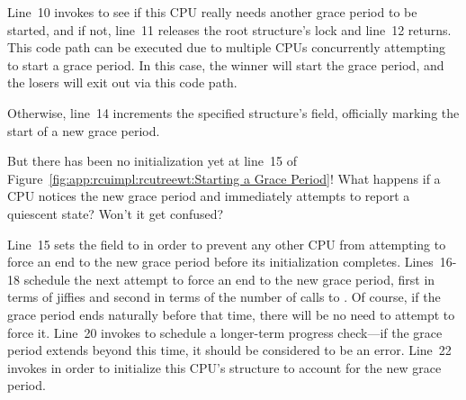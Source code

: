 Line~10 invokes  to see if this CPU really
needs another grace period to be started, and if not, line~11
releases the root  structure's lock and line~12 returns.
This code path can be executed due to multiple CPUs concurrently
attempting to start a grace period.
In this case, the winner will start the grace period, and the losers
will exit out via this code path.

Otherwise, line~14 increments the specified  structure's
 field, officially marking the start of a new grace
period.

\QuickQuiz{}
	But there has been no initialization yet at line~15 of
	Figure~\ref{fig:app:rcuimpl:rcutreewt:Starting a Grace Period}!
	What happens if a CPU notices the new grace period and
	immediately attempts to report a quiescent state?
	Won't it get confused?
 \QuickQuizEnd

Line~15 sets the  field to  in order
to prevent any other CPU from attempting to force an end to the new
grace period before its initialization completes.
Lines~16-18 schedule the next attempt to force an end to the new
grace period, first in terms of jiffies and second in terms of the
number of calls to .
Of course, if the grace period ends naturally before that time,
there will be no need to attempt to force it.
Line~20 invokes  to schedule a
longer-term progress check---if the grace period extends beyond this
time, it should be considered to be an error.
Line~22 invokes  in order to initialize this
CPU's  structure to account for the new grace period.

